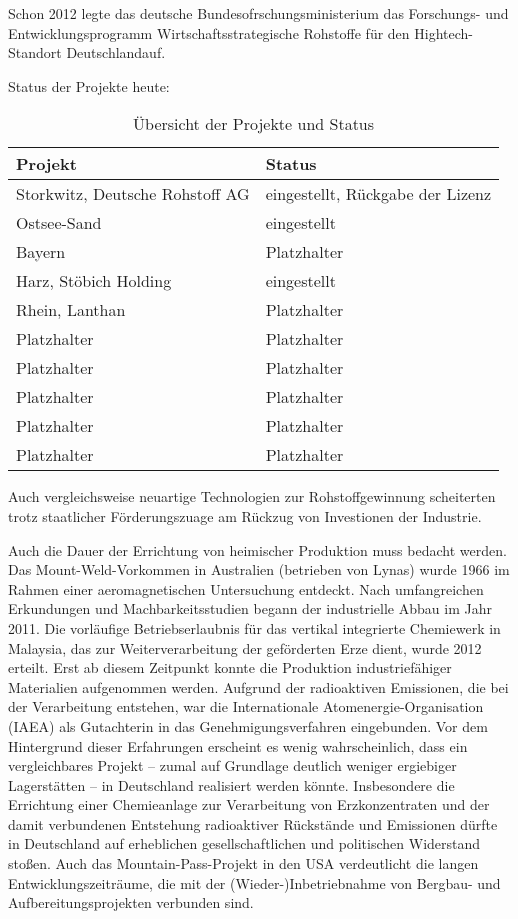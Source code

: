 \documentclass[12pt,a4paper,oneside]{book} %
\begin{document}
Schon 2012 legte das deutsche Bundesofrschungsministerium das Forschungs- und Entwicklungsprogramm \glqq Wirtschaftsstrategische Rohstoffe für den Hightech-Standort Deutschland\grqq auf.

Status der Projekte heute:

\begin{table}[ht]
	\centering
	\begin{tabular}{p{6cm} p{6cm}}
		\toprule
		\textbf{Projekt} & \textbf{Status} \\
		\midrule
		Storkwitz, Deutsche Rohstoff AG & eingestellt, Rückgabe der Lizenz \\
		Ostsee-Sand & eingestellt \\
		Bayern & Platzhalter \\
		Harz, Stöbich Holding & eingestellt \\
		Rhein, Lanthan & Platzhalter \\
		Platzhalter & Platzhalter \\
		Platzhalter & Platzhalter \\
		Platzhalter & Platzhalter \\
		Platzhalter & Platzhalter \\
		Platzhalter & Platzhalter \\
		\bottomrule
	\end{tabular}
	\caption{Übersicht der Projekte und Status}
	\label{tab:projekt_status}
\end{table}

Auch vergleichsweise neuartige Technologien zur Rohstoffgewinnung scheiterten trotz staatlicher Förderungszuage am Rückzug von Investionen der Industrie.

Auch die Dauer der Errichtung von heimischer Produktion muss bedacht werden. Das Mount-Weld-Vorkommen in Australien (betrieben von Lynas) wurde 1966 im Rahmen einer aeromagnetischen Untersuchung entdeckt. Nach umfangreichen Erkundungen und Machbarkeitsstudien begann der industrielle Abbau im Jahr 2011. Die vorläufige Betriebserlaubnis für das vertikal integrierte Chemiewerk in Malaysia, das zur Weiterverarbeitung der geförderten Erze dient, wurde 2012 erteilt. Erst ab diesem Zeitpunkt konnte die Produktion industriefähiger Materialien aufgenommen werden. Aufgrund der radioaktiven Emissionen, die bei der Verarbeitung entstehen, war die Internationale Atomenergie-Organisation (IAEA) als Gutachterin in das Genehmigungsverfahren eingebunden. Vor dem Hintergrund dieser Erfahrungen erscheint es wenig wahrscheinlich, dass ein vergleichbares Projekt – zumal auf Grundlage deutlich weniger ergiebiger Lagerstätten – in Deutschland realisiert werden könnte. Insbesondere die Errichtung einer Chemieanlage zur Verarbeitung von Erzkonzentraten und der damit verbundenen Entstehung radioaktiver Rückstände und Emissionen dürfte in Deutschland auf erheblichen gesellschaftlichen und politischen Widerstand stoßen. Auch das Mountain-Pass-Projekt in den USA verdeutlicht die langen Entwicklungszeiträume, die mit der (Wieder-)Inbetriebnahme von Bergbau- und Aufbereitungsprojekten verbunden sind.
\end{document}
